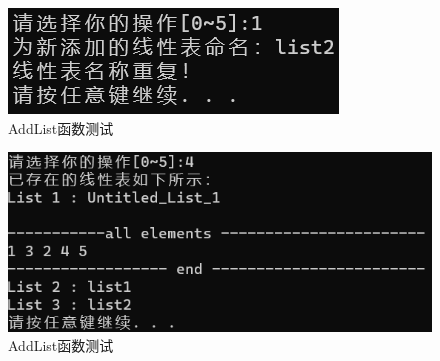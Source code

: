 \documentclass[supercite]{Experimental_Report}
\theoremstyle{definition}
\begin{document}
\begin{enumerate}
\begin{figure}[H] %
	\begin{center}
		\includegraphics[width=0.5\linewidth]{images/linklist/19-1-2.png}
		\caption{ AddList函数测试}
		\label{fig1-16-3}
	\end{center}
\end{figure}
\begin{figure}[H] %
	\begin{center}
		\includegraphics[width=0.5\linewidth]{images/linklist/19-4-1.png}
		\caption{ AddList函数测试}
		\label{fig1-16-4}
	\end{center}
\end{figure}


\end{enumerate}
\end{document}
